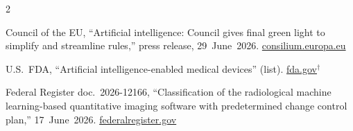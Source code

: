 \documentclass[10pt,a4paper]{article}
\newcommand{\pv}{$^\dagger$}
\begin{document}
\begin{multicols}{2}
\begin{enumerate}[label={[\arabic*]},leftmargin=*,itemsep=0.5pt,topsep=0pt,parsep=0pt]
\item\label{r:eu} Council of the EU, ``Artificial intelligence: Council gives final green light to simplify and streamline rules,'' press release, 29~June~2026. \href{https://www.consilium.europa.eu/en/press/press-releases/2026/06/29/artificial-intelligence-council-gives-final-green-light-to-simplify-and-streamline-rules/}{consilium.europa.eu}
\item\label{r:fda} U.S.\ FDA, ``Artificial intelligence-enabled medical devices'' (list). \href{https://www.fda.gov/medical-devices/artificial-intelligence-enabled-medical-devices/list-artificial-intelligence-enabled-medical-devices}{fda.gov}\pv
\item\label{r:fr} Federal Register doc.\ 2026-12166, ``Classification of the radiological machine learning-based quantitative imaging software with predetermined change control plan,'' 17~June~2026. \href{https://www.federalregister.gov/documents/2026/06/17/2026-12166/medical-devices-radiology-devices-classification-of-the-radiological-machine-learning-based}{federalregister.gov}
\end{enumerate}
\end{multicols}
\end{document}
